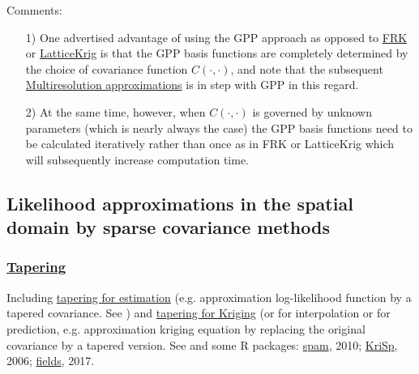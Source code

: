 \documentclass[
12pt, %
a4paper, %
oneside, %
headinclude,footinclude, %
BCOR5mm, %
]{scrartcl}
\begin{document}
\textcolor[rgb]{1.00,0.00,1.00}{Comments:}
\begin{itemize}
 \item [1)]One advertised advantage of using the GPP approach as opposed to \href{https://chenyw68.github.io/Literature/[2017]FRK_intro.pdf}{FRK} or \href{https://chenyw68.github.io/Literature/[2014]LatticeKrig A multi-resolution spatial model for large data.pdf}{LatticeKrig} is that the GPP basis functions are completely determined by the choice of covariance function $C(\cdot, \cdot)$, and note that the subsequent \href{https://chenyw68.github.io/Literature/[2017]A Multi-Resolution Approximation for Massive Spatial Datasets.pdf}{Multiresolution approximations} is in step with GPP in this regard.
\item [2)]At the same time, however, when $C(\cdot, \cdot)$ is governed by unknown parameters (which is nearly always the case) the GPP basis functions need to be calculated iteratively rather than once as in FRK or LatticeKrig which will subsequently increase computation time.
\end{itemize}




\subsection{Likelihood approximations in the spatial domain by sparse covariance methods}
\subsubsection{\href{https://user.math.uzh.ch/furrer/software/KriSp/}{Tapering}}
Including \href{https://chenyw68.github.io/Literature/[2008]Covariance Tapering for Likelihood Based Estimation in Large Spatial Data Sets.pdf}{tapering for estimation} (e.g. approximation log-likelihood function by a tapered covariance. See \href{https://chenyw68.github.io/Literature/[2008]Covariance Tapering for Likelihood Based Estimation in Large Spatial Data Sets.pdf}{\cite{kaufman2008covariance}}) and \href{https://chenyw68.github.io/Literature/[2006]Covariance tapering for interpolation of large spatial datasets.pdf}{tapering for Kriging} (or for interpolation or for prediction, e.g. approximation kriging equation by replacing the original covariance by a tapered version. See \href{https://chenyw68.github.io/Literature/[2006]Covariance tapering for interpolation of large spatial datasets.pdf}{\cite{furrer2006covariance}} and some R packages: \href{https://chenyw68.github.io/Literature/[2010]spam-A Sparse Matrix R Package with Emphasis on MCMC Methods for Gaussian Markov Random Fields.pdf}{spam}, 2010; \href{https://chenyw68.github.io/Literature/[2006]KriSp.pdff}{KriSp}, 2006; \href{https://chenyw68.github.io/Literature/[2020]fields.pdf}{fields}, 2017.
\end{document}

